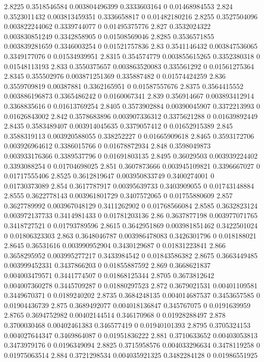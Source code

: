 {2.8225 0.3518546584 0.003804496399 0.3333603164 0 0.01468984553
2.824 0.3523011432 0.003813459351 0.3336658817 0 0.01482180216
2.8255 0.3527504096 0.003822244062 0.3339744077 0 0.01495375776
2.827 0.3532024322 0.003830851249 0.3342858905 0 0.01508569046
2.8285 0.3536571855 0.003839281659 0.3346003254 0 0.01521757836
2.83 0.3541146432 0.003847536065 0.3349177076 0 0.01534939951
2.8315 0.354574779 0.003855615265 0.3352380318 0 0.01548113193
2.833 0.3550375657 0.003863520083 0.335561292 0 0.01561275364
2.8345 0.355502976 0.003871251369 0.335887482 0 0.01574424259
2.836 0.3559709819 0.00387881 0.3362165951 0 0.01587557676
2.8375 0.3564415552 0.003886196873 0.3365486242 0 0.0160067341
2.839 0.356914667 0.003893412914 0.3368835616 0 0.01613769254
2.8405 0.3573902884 0.00390045907 0.3372213993 0 0.01626843002
2.842 0.3578683896 0.003907336312 0.3375621288 0 0.01639892449
2.8435 0.3583489407 0.003914045635 0.3379057412 0 0.01652915389
2.845 0.3588319113 0.003920588055 0.338252227 0 0.01665909618
2.8465 0.3593172706 0.003926964612 0.3386015766 0 0.01678872934
2.848 0.3598049873 0.003933176366 0.3389537796 0 0.01691803135
2.8495 0.36029503 0.003939224402 0.3393088254 0 0.01704698025
2.851 0.3607873666 0.003945109821 0.3396667027 0 0.01717555406
2.8525 0.3612819647 0.003950833749 0.3400274001 0 0.01730373089
2.854 0.3617787917 0.00395639733 0.3403909055 0 0.01743148884
2.8555 0.3622778143 0.003961801729 0.3407572065 0 0.01755880609
2.857 0.3627789992 0.003967048129 0.3411262902 0 0.01768566084
2.8585 0.3632823124 0.003972137733 0.3414981433 0 0.01781203136
2.86 0.3637877198 0.003977071765 0.3418727521 0 0.01793789596
2.8615 0.3642951869 0.003981851462 0.3422501024 0 0.01806323303
2.863 0.3648046787 0.003986478083 0.3426301796 0 0.018188021
2.8645 0.36531616 0.003990952904 0.3430129687 0 0.01831223841
2.866 0.3658295952 0.003995277217 0.3433984542 0 0.01843586382
2.8675 0.3663449485 0.003999452331 0.3437866203 0 0.01855887592
2.869 0.3668621837 0.004003479571 0.3441774507 0 0.01868125344
2.8705 0.3673812642 0.004007360278 0.3445709287 0 0.01880297523
2.872 0.3679021531 0.00401109581 0.3449670371 0 0.0189240202
2.8735 0.3684248135 0.004014687537 0.3453657585 0 0.01904436739
2.875 0.3689492077 0.004018136847 0.345767075 0 0.0191639959
2.8765 0.3694752982 0.00402144514 0.346170968 0 0.01928288497
2.878 0.3700030468 0.00402461383 0.346577419 0 0.01940101393
2.8795 0.3705324153 0.004027644347 0.3469864087 0 0.01951836222
2.881 0.3710633652 0.00403053813 0.3473979176 0 0.0196349094
2.8825 0.3715958576 0.004033296634 0.3478119258 0 0.01975063514
2.884 0.3721298534 0.004035921325 0.3482284128 0 0.01986551925
}
